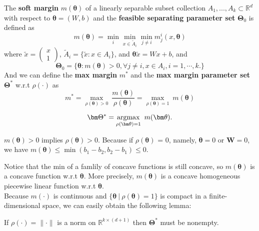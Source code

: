 \begin{definition}[margin]
	The \textbf{soft margin} $m(\bm\theta)$ of a linearly separable subset collection $A_1,...,A_k\subset \mathbb{R}^d$ with respect to $\bm\theta = (W,b)$ and the \textbf{feasible separating parameter set} $\bm\Theta_0$ is defined as 
	\begin{equation}
	m(\bm\theta) =  \min_{i} \min_{x\in \tilde{A}_i} \min_{j\neq i} m_j^i(x,\bm\theta)
	\end{equation}
	where $\tilde x = 
	\begin{pmatrix}
	x\\
	1
	\end{pmatrix}$,  $\tilde A_i = \{\tilde{x}: x\in A_i\}$, and $\bm \theta \tilde{x} = Wx + b$, and
	\begin{equation}
	\bm\Theta_0 = \{\bm\theta: m(\bm\theta) > 0, \forall j\neq i, x\in A_i, i = 1,\cdots,k.\}
	\end{equation}
	And we can define the \textbf{max margin} $m^*$ and the \textbf{max margin parameter set} $\bm\Theta^*$ w.r.t $\rho(\cdot)$ as 
	\begin{equation}
	m^* = \max_{\rho(\bm \theta)>0}\ \frac{m(\bm\theta)}{\rho(\bm\theta)} = \max_{\rho(\bm \theta)= 1}\ m(\bm\theta)
	\end{equation}
	
	\begin{equation}
	\bm\Theta^* = \mathop{\rm argmax}_{\rho(\bm \theta)= 1}\ m(\bm\theta).
	\end{equation} 
\end{definition}



\begin{remark}
	$m(\bm\theta)>0$ implies $\rho(\bm\theta)>0$. Because if $\rho(\bm\theta)$ = 0, namely, $\bm\theta = 0$ or $\bm W = 0$, we have $m(\bm\theta) \leq \min (b_1-b_2,b_2-b_1) \leq 0$.
\end{remark}

Notice that the min of a famlily of concave functions is still concave, so $m(\bm\theta)$ is a concave function w.r.t $\bm\theta$. More precisely, $m(\bm\theta)$ is a concave homogeneous piecewise linear function w.r.t $\bm\theta$. \\
Because $m(\cdot)$ is continuous and $\{\bm\theta\ | \ \rho(\bm\theta) = 1\}$ is compact in a finite-dimensional space, we can easily obtain the following lemma:

\begin{lemma}
	If $\rho(\cdot) = \|\cdot\|$ is a norm on $\mathbb{R}^{k\times (d+1)} $ then $\bm\Theta^*$ must be nonempty.
\end{lemma}


